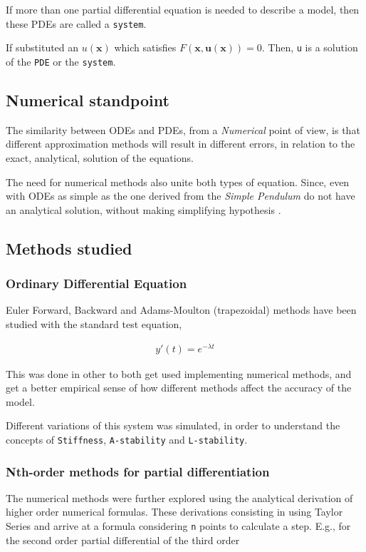 \documentclass[11pt]{article}
\begin{document}
If more than one partial differential equation is needed to describe a model,
then these PDEs are called a \texttt{system}.

If substituted an \(u(\mathbf{x})\) which satisfies
\(F(\mathbf{x},\mathbf{u(x)})=0\). Then, \texttt{u} is a solution of the \texttt{PDE} or the
\texttt{system}.

\subsection{Numerical standpoint}
\label{sec:org4836cc8}
The similarity between ODEs and PDEs, from a \emph{Numerical} point of view, is
that different approximation methods will result in different errors,
in relation to the exact, analytical, solution of the equations.

The need for numerical methods also unite both types of
equation. Since, even with ODEs as simple as the one derived from the
\emph{Simple Pendulum} do not have an analytical solution, without making simplifying
hypothesis \cite{brauer1989qualitative}.

\subsection{Methods studied}
\label{sec:org1601f68}

\subsubsection{Ordinary Differential Equation}
\label{sec:org50f4371}
Euler Forward, Backward and Adams-Moulton (trapezoidal) methods have been
studied with the standard test equation,

\begin{equation}
\begin{aligned}
y'(t)=e^{- \lambda{}t}
\end{aligned}
\end{equation}

This was done in other to both get used implementing numerical methods, and get
a better empirical sense of how different methods affect the accuracy of the
model.

Different variations of this system was simulated, in order to understand the
concepts of \texttt{Stiffness}, \texttt{A-stability} and \texttt{L-stability}.

\subsubsection{Nth-order methods for partial differentiation}
\label{sec:org719871a}
The numerical methods were further explored using the analytical derivation of
higher order numerical formulas. These derivations consisting in using Taylor
Series and arrive at a formula considering \texttt{n} points to calculate a step. E.g.,
for the second order partial differential of the third order
\end{document}
